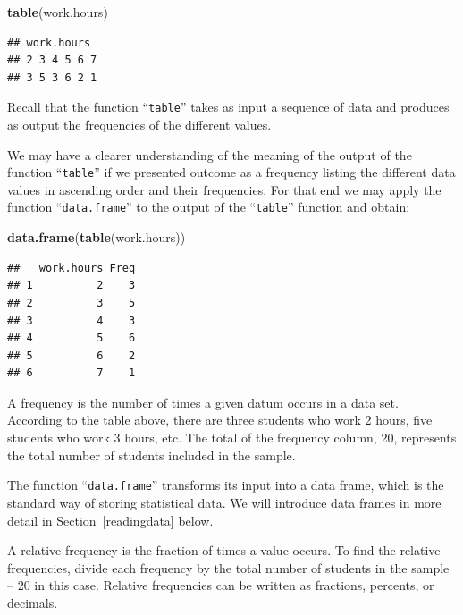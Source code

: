 \documentclass[]{krantz}
\makeatletter
\newenvironment{Shaded}{\begin{snugshade}}{\end{snugshade}}
\newcommand{\KeywordTok}[1]{\textcolor[rgb]{0.13,0.29,0.53}{\textbf{#1}}}
\newcommand{\NormalTok}[1]{#1}
\newenvironment{kframe}{%
\medskip{}
\setlength{\fboxsep}{.8em}
 \def\at@end@of@kframe{}%
 \ifinner\ifhmode%
  \def\at@end@of@kframe{\end{minipage}}%
  \begin{minipage}{\columnwidth}%
 \fi\fi%
 \def\FrameCommand##1{\hskip\@totalleftmargin \hskip-\fboxsep
 \colorbox{shadecolor}{##1}\hskip-\fboxsep
     \hskip-\linewidth \hskip-\@totalleftmargin \hskip\columnwidth}%
 \MakeFramed {\advance\hsize-\width
   \@totalleftmargin\z@ \linewidth\hsize
   \@setminipage}}%
 {\par\unskip\endMakeFramed%
 \at@end@of@kframe}
\renewenvironment{Shaded}{\begin{kframe}}{\end{kframe}}
\theoremstyle{definition}
\theoremstyle{definition}
\theoremstyle{definition}
\theoremstyle{remark}
\makeatother
\begin{document}
\begin{Shaded}
\begin{Highlighting}[]
\KeywordTok{table}\NormalTok{(work.hours)}
\end{Highlighting}
\end{Shaded}

\begin{verbatim}
## work.hours
## 2 3 4 5 6 7 
## 3 5 3 6 2 1
\end{verbatim}

Recall that the function ``\texttt{table}'' takes as input a sequence of data and
produces as output the frequencies of the different values.

We may have a clearer understanding of the meaning of the output of the
function ``\texttt{table}'' if we presented outcome as a frequency listing the
different data values in ascending order and their frequencies. For that
end we may apply the function ``\texttt{data.frame}'' to the output of the
``\texttt{table}'' function and obtain:

\begin{Shaded}
\begin{Highlighting}[]
\KeywordTok{data.frame}\NormalTok{(}\KeywordTok{table}\NormalTok{(work.hours))}
\end{Highlighting}
\end{Shaded}

\begin{verbatim}
##   work.hours Freq
## 1          2    3
## 2          3    5
## 3          4    3
## 4          5    6
## 5          6    2
## 6          7    1
\end{verbatim}

A frequency is the number of times a given datum occurs in a data set.
According to the table above, there are three students who work 2 hours,
five students who work 3 hours, etc. The total of the frequency column,
20, represents the total number of students included in the sample.

The function ``\texttt{data.frame}'' transforms its input into a data frame,
which is the standard way of storing statistical data. We will introduce
data frames in more detail in Section~\ref{readingdata} below.

A relative frequency is the fraction of times a value occurs. To find
the relative frequencies, divide each frequency by the total number of
students in the sample -- 20 in this case. Relative frequencies can be
written as fractions, percents, or decimals.
\end{document}

